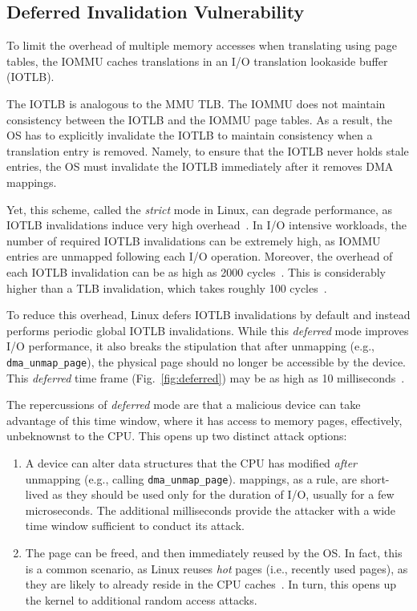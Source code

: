 \subsection{Deferred Invalidation Vulnerability}\label{sec:deferred}

To limit the overhead of multiple memory accesses when translating \iova{} using page tables, the IOMMU caches translations in an I/O translation lookaside buffer (IOTLB). 

The IOTLB is analogous to the MMU TLB. The IOMMU does not maintain consistency between the IOTLB and the IOMMU page tables. As a result, the OS has to explicitly invalidate the IOTLB to maintain consistency when a translation entry is removed. Namely, to ensure that the IOTLB never holds stale entries, the OS must invalidate the IOTLB immediately after it removes DMA mappings. 

Yet, this scheme, called the \emph{strict} mode in Linux, can degrade performance, as IOTLB invalidations induce very high overhead~\cite{MMT16,MSMT18,Peleg15}. In I/O intensive workloads, the number of required IOTLB invalidations can be extremely high, as IOMMU entries are unmapped following each I/O operation. Moreover, the overhead of each IOTLB invalidation can be as high as 2000 cycles~\cite{ABYTS11}. This is considerably higher than a TLB invalidation, which takes roughly 100 cycles~\cite{Han14}. 

To reduce this overhead, Linux defers IOTLB invalidations by default and instead performs periodic global IOTLB invalidations. While this \emph{deferred} mode improves I/O performance, it also breaks the stipulation that after unmapping (e.g., \texttt{dma\_unmap\_page}), the physical page should no longer be accessible by the device. This \emph{deferred} time frame (Fig.~\ref{fig:deferred}) may be as high as 10 milliseconds~\cite{MSMT18}.

The repercussions of \emph{deferred} mode are that a malicious device can take advantage of this time window, where it has access to memory pages, effectively, unbeknownst to the CPU. This opens up two distinct attack options:

\begin{enumerate}
    \item A device can alter data structures that the CPU has modified \emph{after} unmapping (e.g., calling \texttt{dma\_unmap\_page}).
    \iova{} mappings, as a rule, are short-lived as they should be used only for the duration of I/O, usually for a few microseconds. The additional milliseconds provide the attacker with a wide time window sufficient to conduct its attack.
    \item The page can be freed, and then immediately reused by the OS. In fact, this is a common scenario, as Linux reuses \emph{hot} pages (i.e., recently used pages), as they are likely to already reside in the CPU caches~\cite{hotcold}. In turn, this opens up the kernel to additional random access attacks.
\end{enumerate}

